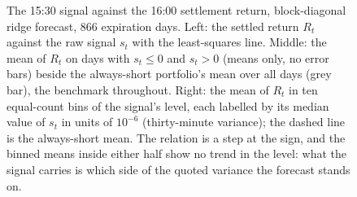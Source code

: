 \begin{figure}[H]
\centering
{}
\caption{The 15:30 signal against the 16:00 settlement return, block-diagonal
ridge forecast, 866 expiration days. Left: the settled return $R_t$ against
the raw signal $s_t$ with the least-squares line. Middle: the mean of $R_t$ on
days with $s_t \le 0$ and $s_t > 0$ (means only, no error bars) beside the
always-short portfolio's mean over all days (grey bar), the benchmark throughout.
Right: the mean of $R_t$ in ten equal-count bins of the signal's level, each
labelled by its median value of $s_t$ in units of $10^{-6}$ (thirty-minute
variance); the dashed line is the always-short mean. The relation is a step at
the sign, and the binned means inside either half show no trend in the level:
what the signal carries is which side of the quoted variance the forecast
stands on.}
\label{fig:close_option_sameday}
\end{figure}


